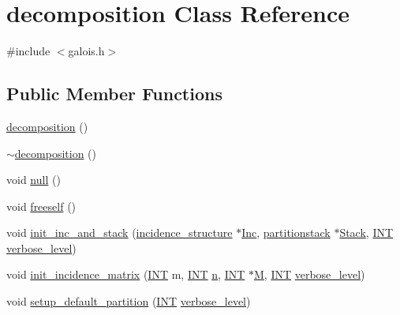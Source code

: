 \hypertarget{classdecomposition}{}\section{decomposition Class Reference}
\label{classdecomposition}


{\ttfamily \#include $<$galois.\+h$>$}

\subsection*{Public Member Functions}
\begin{DoxyCompactItemize}
\item 
\mbox{\hyperlink{classdecomposition_a7e381393157c79ff35fd735fb6f9d949}{decomposition}} ()
\item 
\mbox{\hyperlink{classdecomposition_a3dd914483ded567dd02ea8842aa54911}{$\sim$decomposition}} ()
\item 
void \mbox{\hyperlink{classdecomposition_aedb7655f8968880b5dfd3a4e6ebdb9d7}{null}} ()
\item 
void \mbox{\hyperlink{classdecomposition_ab15b8062ad9c42007710da27928a6b2d}{freeself}} ()
\item 
void \mbox{\hyperlink{classdecomposition_a7ae99b35e0c8caeb4bfa818ce9f9fb99}{init\+\_\+inc\+\_\+and\+\_\+stack}} (\mbox{\hyperlink{classincidence__structure}{incidence\+\_\+structure}} $\ast$\mbox{\hyperlink{classdecomposition_aaea4c461275e299bee3a91362b6977de}{Inc}}, \mbox{\hyperlink{classpartitionstack}{partitionstack}} $\ast$\mbox{\hyperlink{classdecomposition_a696d052f5b11b84c8a417529bc41db7f}{Stack}}, \mbox{\hyperlink{galois_8h_a09fddde158a3a20bd2dcadb609de11dc}{I\+NT}} \mbox{\hyperlink{simeon_8_c_a818073fbcc2f439e7c56952f67386122}{verbose\+\_\+level}})
\item 
void \mbox{\hyperlink{classdecomposition_a4f3a4234d97c3f3615a75614be55b3af}{init\+\_\+incidence\+\_\+matrix}} (\mbox{\hyperlink{galois_8h_a09fddde158a3a20bd2dcadb609de11dc}{I\+NT}} m, \mbox{\hyperlink{galois_8h_a09fddde158a3a20bd2dcadb609de11dc}{I\+NT}} \mbox{\hyperlink{simeon_8_c_a7f2cd26777ce0ff3fdaf8d02aacbddfb}{n}}, \mbox{\hyperlink{galois_8h_a09fddde158a3a20bd2dcadb609de11dc}{I\+NT}} $\ast$\mbox{\hyperlink{plane__search_8_c_ad2d23ebd03187a91edd45b1d5e496265}{M}}, \mbox{\hyperlink{galois_8h_a09fddde158a3a20bd2dcadb609de11dc}{I\+NT}} \mbox{\hyperlink{simeon_8_c_a818073fbcc2f439e7c56952f67386122}{verbose\+\_\+level}})
\item 
void \mbox{\hyperlink{classdecomposition_a8589476ff85bb44acc19de00ffdf1b7f}{setup\+\_\+default\+\_\+partition}} (\mbox{\hyperlink{galois_8h_a09fddde158a3a20bd2dcadb609de11dc}{I\+NT}} \mbox{\hyperlink{simeon_8_c_a818073fbcc2f439e7c56952f67386122}{verbose\+\_\+level}})

\end{DoxyCompactItemize}
